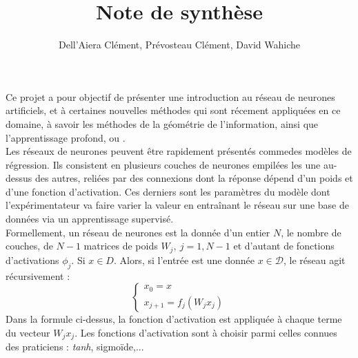 \documentclass{article}
\title{Note de synthèse}
\author{Dell'Aiera Clément, Prévosteau Clément, David Wahiche}
\date{}
\begin{document}
\maketitle


Ce projet a pour objectif de présenter une introduction au réseau de neurones artificiels, et à certaines nouvelles méthodes qui sont récement appliquées en ce domaine, à savoir les méthodes de la géométrie de l'information, ainsi que l'apprentissage profond, ou .\\

Les réseaux de neurones peuvent être rapidement présentés commedes modèles de régression. Ils consistent en plusieurs couches de neurones empilées les une au-dessus des autres, reliées par des connexions dont la réponse dépend d'un poids et d'une fonction d'activation. Ces derniers sont les paramètres du modèle dont l'expérimentateur va faire varier la valeur en entraînant le réseau sur une base de données via un apprentissage supervisé. \\

Formellement, un réseau de neurones est la donnée d'un entier $N$, le nombre de couches, de $N-1$ matrices de poids $W_j, \ j=1,N-1$ et d'autant de fonctions d'activations $\phi_j$. Si $x\in D$. Alors, si l'entrée est une donnée $x\in \mathcal D$, le réseau agit récursivement :
\[\left\{\begin{array}{c}x_0=x\\ x_{j+1}=f_j(W_j x_j)\end{array}\right.\]
Dans la formule ci-dessus, la fonction d'activation est appliquée à chaque terme du vecteur $W_j x_j$. Les fonctions d'activation sont à choisir parmi celles connues des praticiens : \textit{tanh}, sigmoïde,...






 
\nocite{*}
\end{document}

